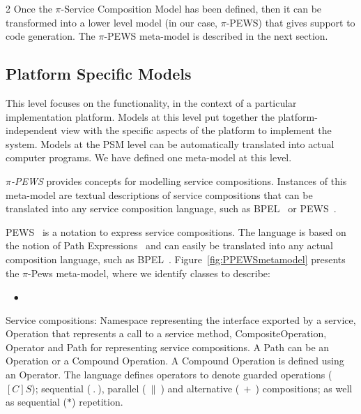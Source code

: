\documentclass[12pt,twoside]{article}
\theoremstyle{plain}
\theoremstyle{plain}
\newenvironment{itemizedTrivlist}{\begin{list}{\rm ~\hspace{2mm} $\bullet$\ }
                                         {\setlength{\leftmargin}{0pt}
                                          \setlength{\rightmargin}{0pt}
                                          \setlength{\itemindent}{12pt}
                                          \setlength{\listparindent}{0pt}}}
                            {\end{list}}
\begin{document}
\begin{multicols}{2}
Once the $\pi$-Service Composition Model has been defined, then it can be transformed into a lower level model (in our case, $\pi$-PEWS) that gives support to code generation.
The $\pi$-PEWS  meta-model is described in the next section.


\subsection{Platform Specific Models}

This level focuses on the functionality, in the context of a particular implementation platform.
Models at this level put together the platform-independent view with the specific aspects of the platform to implement the system.
Models at the PSM level can be automatically translated into actual computer programs.
We have defined one meta-model at this level.

\textit{$\pi$-PEWS} provides con\-cepts for modelling service compositions.
Instances of this meta-model are textual descriptions of service compositions that can be translated into any service composition language, such as BPEL~\cite{bpel03} or PEWS~\cite{BaCAM05,Placido2010LTPD}.

PEWS~\cite{BHM06,Placido2010LTPD} is a notation to express service compositions.
The language is based on the notion of Path Expressions~\cite{And79} and can easily be translated into any actual composition language, such as BPEL~\cite{bpel03}.
Figure~\ref{fig:PPEWSmetamodel} presents the $\pi$-{\sc Pews} meta-model, where we identify classes to describe:
\begin{itemizedTrivlist}
\item Service compositions: {\sc Namespace} representing the interface exported by a service, {\sc Operation} that represents a call to a service method, {\sc CompositeOperation}, {\sc Operator} and {\sc Path} for representing service compositions.
A {\sc Path} can be an {\sc Operation} or a {\sc Compound Operation}.
A {\sc Compound Operation} is defined using an {\sc Operator}.
The language defines operators to denote guarded operations ($[C]S$); sequential ($\ . \ $), parallel ($\ \| \ $) and alternative ($\ + \ $) compositions; as well as sequential ($*$) repetition.


\end{itemizedTrivlist}
\end{multicols}
\end{document}
